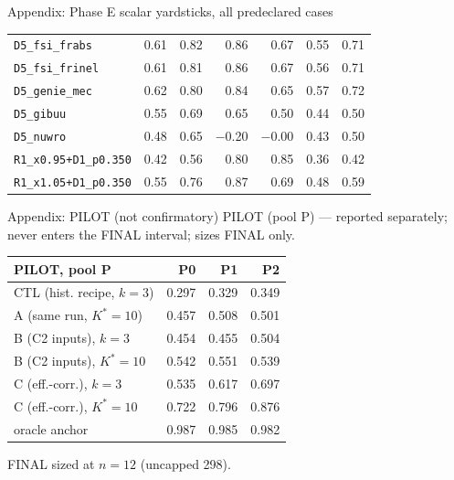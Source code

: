 \documentclass[aspectratio=169,10pt]{beamer}
\def\evidencetext{}
\begin{document}
\begin{frame}{Appendix: Phase E scalar yardsticks, all predeclared cases}
\begin{center}
{\begin{tabular}{lrrrrrr}
\texttt{D5\_fsi\_frabs} & 0.61 & 0.82 & 0.86 & 0.67 & 0.55 & 0.71 \\
\texttt{D5\_fsi\_frinel} & 0.61 & 0.81 & 0.86 & 0.67 & 0.56 & 0.71 \\
\texttt{D5\_genie\_mec} & 0.62 & 0.80 & 0.84 & 0.65 & 0.57 & 0.72 \\
\texttt{D5\_gibuu} & 0.55 & 0.69 & 0.65 & 0.50 & 0.44 & 0.50 \\
\texttt{D5\_nuwro} & 0.48 & 0.65 & \ensuremath{-}0.20 & \ensuremath{-}0.00 & 0.43 & 0.50 \\
\texttt{R1\_x0.95+D1\_p0.350} & 0.42 & 0.56 & 0.80 & 0.85 & 0.36 & 0.42 \\
\texttt{R1\_x1.05+D1\_p0.350} & 0.55 & 0.76 & 0.87 & 0.69 & 0.48 & 0.59 \\
\bottomrule
\end{tabular}}
\end{center}
\end{frame}

\gdef\evidencetext{\texttt{confirm/results/confirm\_results.json}}
\begin{frame}{Appendix: PILOT (not confirmatory)}
{\small PILOT (pool P) --- reported separately; never enters the FINAL interval; sizes FINAL only.}
\begin{center}
{\footnotesize
\begin{tabular}{lrrr}
\toprule
PILOT, pool P & P0 & P1 & P2 \\
\midrule
CTL (hist. recipe, $k=3$) & 0.297 & 0.329 & 0.349 \\
A (same run, $K^*=10$) & 0.457 & 0.508 & 0.501 \\
B (C2 inputs), $k=3$ & 0.454 & 0.455 & 0.504 \\
B (C2 inputs), $K^*=10$ & 0.542 & 0.551 & 0.539 \\
C (eff.-corr.), $k=3$ & 0.535 & 0.617 & 0.697 \\
C (eff.-corr.), $K^*=10$ & 0.722 & 0.796 & 0.876 \\
oracle anchor & 0.987 & 0.985 & 0.982 \\
\bottomrule
\end{tabular}}
\end{center}
{\small FINAL sized at $n=12$ (uncapped 298).}
\end{frame}
\end{document}
